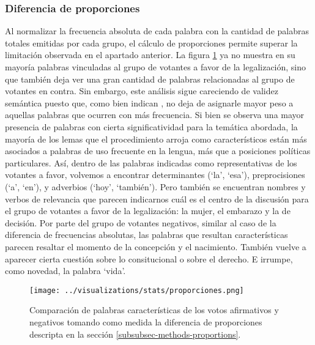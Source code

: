 \subsubsection{Diferencia de proporciones}
\label{subsubsec-results-proporcions}
Al normalizar la frecuencia absoluta de cada palabra con la cantidad
de palabras totales emitidas por cada grupo, el c\'alculo de proporciones permite
superar la limitaci\'on observada en el apartado anterior.
La figura \ref{fig-statistics-proportions} ya no muestra en su mayor\'ia palabras
vinculadas al grupo de votantes a favor de la legalizaci\'on, sino que tambi\'en
deja ver una gran cantidad de palabras relacionadas al grupo de votantes en contra.
Sin embargo, este an\'alisis sigue careciendo de validez sem\'antica puesto que, como bien
indican \cite{monroe2008fightin}, no deja de asignarle mayor peso a aquellas palabras
que ocurren con m\'as frecuencia. Si bien se observa una mayor presencia de palabras
con cierta significatividad para la tem\'atica abordada, la mayor\'ia de los lemas
que el procedimiento arroja como caracter\'isticos est\'an m\'as asociados a palabras
de uso frecuente en la lengua, m\'as que a posiciones pol\'iticas particulares. As\'i,
dentro de las palabras indicadas como representativas de los votantes a favor,
volvemos a encontrar determinantes (`la', `esa'), preprocisiones (`a', `en'),
y adverbios (`hoy', `tambi\'en'). Pero tambi\'en se encuentran nombres y verbos
de relevancia que parecen indicarnos cu\'al es el centro de la discusi\'on para el
grupo de votantes a favor de la legalizaci\'on: la mujer, el embarazo y la
de decisi\'on. Por parte del grupo de votantes negativos, similar al caso de
la diferencia de frecuencias absolutas, las palabras que resultan
caracter\'isticas parecen resaltar  el momento de la concepci\'on y el nacimiento.
Tambi\'en vuelve a aparecer cierta cuesti\'on sobre lo consitucional o sobre el derecho.
E irrumpe, como novedad, la palabra `vida'.

\begin{figure}[h!]
    \centering
    \texttt{[image: ../visualizations/stats/proporciones.png]}
    \caption{Comparaci\'on de palabras caracter\'isticas de los votos afirmativos y
    negativos tomando como medida la diferencia de proporciones descripta
    en la secci\'on \ref{subsubsec-methods-proportions}.}
    \label{fig-statistics-proportions}
\end{figure}

